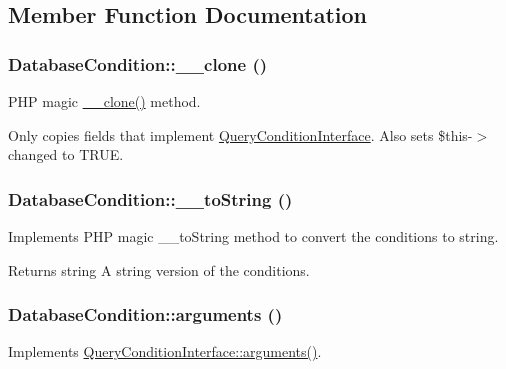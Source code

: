 \subsection{Member Function Documentation}
\hypertarget{classDatabaseCondition_a7d229e52b09544a9ecd3a875f186f1b9}{
\subsubsection[{\_\-\_\-clone}]{\setlength{\rightskip}{0pt plus 5cm}DatabaseCondition::\_\-\_\-clone ()}}
\label{classDatabaseCondition_a7d229e52b09544a9ecd3a875f186f1b9}
PHP magic \hyperlink{classDatabaseCondition_a7d229e52b09544a9ecd3a875f186f1b9}{\_\-\_\-clone()} method.

Only copies fields that implement \hyperlink{interfaceQueryConditionInterface}{QueryConditionInterface}. Also sets \$this-\/$>$changed to TRUE. \hypertarget{classDatabaseCondition_ac892cebcde8a71570e3a22c35fa98592}{
\subsubsection[{\_\-\_\-toString}]{\setlength{\rightskip}{0pt plus 5cm}DatabaseCondition::\_\-\_\-toString ()}}
\label{classDatabaseCondition_ac892cebcde8a71570e3a22c35fa98592}
Implements PHP magic \_\-\_\-toString method to convert the conditions to string.

\begin{DoxyReturn}{Returns}
string A string version of the conditions. 
\end{DoxyReturn}
\hypertarget{classDatabaseCondition_abfffa491de7087f1521e9868915f0169}{
\subsubsection[{arguments}]{\setlength{\rightskip}{0pt plus 5cm}DatabaseCondition::arguments ()}}
\label{classDatabaseCondition_abfffa491de7087f1521e9868915f0169}
Implements \hyperlink{interfaceQueryConditionInterface_ac2349e02d5332412182cf472ba1a1b1e}{QueryConditionInterface::arguments()}. 

